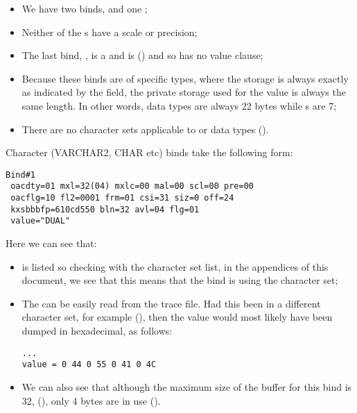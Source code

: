 \begin{itemize}
\tightlist
\item
  We have two  binds, and one ;
\item
  Neither of the s have a scale or precision;
\item
  The last bind, , is a  and is  () and so has no value clause;
\item
  Because these binds are of specific types, where the storage is always exactly as indicated by the  field, the private storage used for the value is always the same length. In other words,  data types are always 22 bytes while s are 7;
\item
  There are no character sets applicable to  or  data types ().
\end{itemize}

Character (VARCHAR2, CHAR etc) binds take the following form:

\begin{lstlisting}[numbers=none,caption={Bind Example - VARCHAR2 with WE8ISO8859P1 Characterset}]
Bind#1
 oacdty=01 mxl=32(04) mxlc=00 mal=00 scl=00 pre=00
 oacflg=10 fl2=0001 frm=01 csi=31 siz=0 off=24
 kxsbbbfp=610cd550 bln=32 avl=04 flg=01
 value="DUAL"
\end{lstlisting}

Here we can see that:

\begin{itemize}
\item
   is listed so checking with the character set list, in the appendices of this document, we see that this means that the bind is using the  character set;
\item
  The  can be easily read from the trace file. Had this been in a different character set,  for example (), then the value would most likely have been dumped in hexadecimal, as follows:

\begin{lstlisting}[numbers=none,caption={Bind Example - VARCHAR2 with ALUTF16 Characterset}]
...
value = 0 44 0 55 0 41 0 4C
\end{lstlisting}
\item
  We can also see that although the maximum size of the buffer for this bind is 32, (), only 4 bytes are in use
  ().
\end{itemize}

